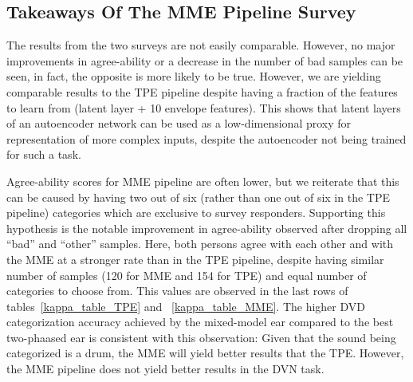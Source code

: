 \documentclass[\main/thesis.tex]{subfiles}
\begin{document}
\subsection{Takeaways Of The MME Pipeline Survey}
\label{survey2_takeaway}
The results from the two surveys are not easily comparable. However, no major improvements in agree-ability or a decrease in the number of bad samples can be seen, in fact, the opposite is more likely to be true. However, we are yielding comparable results to the TPE pipeline despite having a fraction of the features to learn from (latent layer + 10 envelope features). This shows that latent layers of an autoencoder network can be used as a low-dimensional proxy for representation of more complex inputs, despite the autoencoder not being trained for such a task. 

Agree-ability scores for MME pipeline are often lower, but we reiterate that this can be caused by having two out of six (rather than one out of six in the TPE pipeline) categories which are exclusive to survey responders. Supporting this hypothesis is the notable improvement in agree-ability observed after dropping all \enquote{bad} and \enquote{other} samples. Here, both persons agree with each other and with the MME at a stronger rate than in the TPE pipeline, despite having similar number of samples (120 for MME and 154 for TPE) and equal number of categories to choose from. This values are observed in the last rows of tables~\ref{kappa_table_TPE} and ~\ref{kappa_table_MME}. The higher DVD categorization accuracy achieved by the mixed-model ear compared to the best two-phaased ear is consistent with this observation: Given that the sound being categorized is a drum, the MME will yield better results that the TPE. However, the MME pipeline does not yield better results in the DVN task. 


\end{document}
